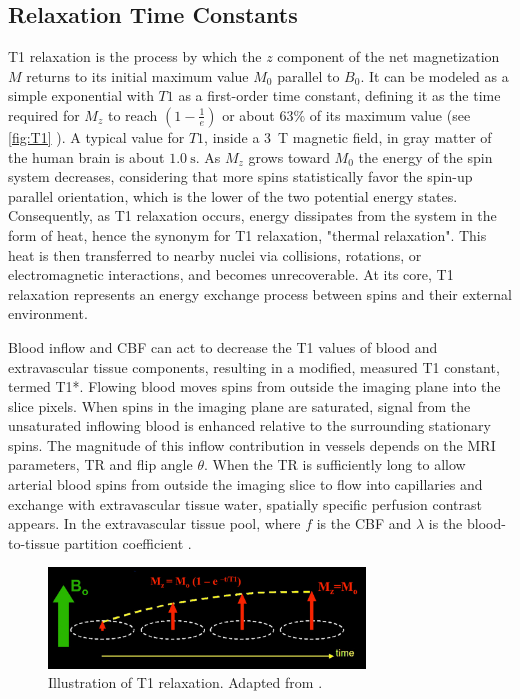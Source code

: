 \subsection{Relaxation Time Constants}

T1 relaxation is the process by which the $z$ component of the net magnetization $M$ returns to its initial maximum value $M_0$ parallel to $B_0$. It can be modeled as a simple exponential with $T1$ as a first-order time constant, defining it as the time required for $M_z$ to reach $(1 - \frac{1}{e})$ or about $63\%$ of its maximum value (see \autoref{fig:T1} \cite{T1}). A typical value for $T1$, inside a \SI{3}{\tesla} magnetic field, in gray matter of the human brain is about $\SI{1.0}{\second}$. As $M_z$ grows toward $M_0$ the energy of the spin system decreases, considering that more spins statistically favor the spin-up parallel orientation, which is the lower of the two potential energy states. Consequently, as T1 relaxation occurs, energy dissipates from the system in the form of heat, hence the synonym for T1 relaxation, "thermal relaxation". This heat is then transferred to nearby nuclei via collisions, rotations, or electromagnetic interactions, and becomes unrecoverable. At its core, T1 relaxation represents an energy exchange process between spins and their external environment.

Blood inflow and \gls{CBF} can act to decrease the T1 values of blood and extravascular tissue components, resulting in a modified, measured T1 constant, termed T1*. Flowing blood moves spins from outside the imaging plane into the slice pixels. When spins in the imaging plane are saturated, signal from the unsaturated inflowing blood is enhanced relative to the surrounding stationary spins. The magnitude of this inflow contribution in vessels depends on the \gls{MRI} parameters, \gls{TR} and \gls{flip angle} $\theta$. When the \gls{TR} is sufficiently long to allow arterial blood spins from outside the imaging slice to flow into capillaries and exchange with extravascular tissue water, spatially specific perfusion contrast appears. In the extravascular tissue pool,  where $f$ is the \gls{CBF} and $\lambda$ is the blood-to-tissue partition coefficient \cite{Detre1992}. 

\begin{figure}[htbp]
    \centering
    \includegraphics[width = 0.75\textwidth]{assets/images/T1_illustration.jpg}
    \caption[T1 Relaxation]{Illustration of T1 relaxation. Adapted from \cite{T1}.}
    \label{fig:T1}
\end{figure}

